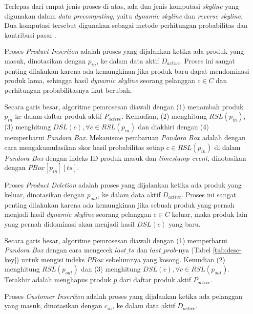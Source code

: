 Terlepas dari empat jenis proses di atas, ada dua jenis komputasi \textit{skyline} yang digunakan dalam \textit{data precomputing}, yaitu \textit{dynamic skyline} dan \textit{reverse skyline}. Dua komputasi tersebut digunakan sebagai metode perhitungan probabilitas dan kontribusi pasar \cite{kmpp}. 


Proses \textit{Product Insertion} adalah proses yang dijalankan ketika ada produk yang masuk, dinotasikan dengan $p_{in}$, ke dalam data aktif $D_{active}$. Proses ini sangat penting dilakukan karena ada kemungkinan jika produk baru dapat mendominasi produk lama, sehingga hasil \textit{dynamic skyline} seorang pelanggan $c \in C$ dan perhitungan probabilitasnya ikut berubah.

Secara garis besar, algoritme pemrosesan diawali dengan (1) menambah produk $p_{in}$ ke dalam daftar produk aktif $P_{active}$. Kemudian, (2) menghitung $RSL(p_{in})$, (3) menghitung $DSL(c), \forall c \in RSL(p_{in})$ dan diakhiri dengan (4) memperbarui \textit{Pandora Box}. Mekanisme pembaruan \textit{Pandora Box} adalah dengan cara mengakumulasikan skor hasil probabilitas setiap $c \in RSL(p_{in})$ di dalam \textit{Pandora Box} dengan indeks ID produk masuk dan \textit{timestamp event}, dinotasikan dengan $PBox[p_{in}][ts]$.


Proses \textit{Product Deletion} adalah proses yang dijalankan ketika ada produk yang keluar, dinotasikan dengan $p_{out}$,  ke dalam data aktif $D_{active}$. Proses ini sangat penting dilakukan karena ada kemungkinan jika sebuah produk yang pernah menjadi hasil \textit{dynamic skyline} seorang pelanggan $c \in C$ keluar, maka produk lain yang pernah didominasi akan menjadi hasil $DSL(c)$ yang baru.

Secara garis besar, algoritme pemrosesan diawali dengan (1) memperbarui \textit{Pandora Box} dengan cara mengecek $last\_ts$ dan $last\_prob$-nya (Tabel \ref{tab:desc-key}) untuk mengisi indeks $PBox$ sebelumnya yang kosong. Kemudian (2) menghitung $RSL(p_{out})$ dan (3) menghitung $DSL(c), \forall c \in RSL(p_{out})$. Terakhir adalah menghapus produk $p$ dari daftar produk aktif $P_{active}$.


Proses \textit{Customer Insertion} adalah proses yang dijalankan ketika ada pelanggan yang masuk, dinotasikan dengan $c_{in}$, ke dalam data aktif $D_{active}$. 

